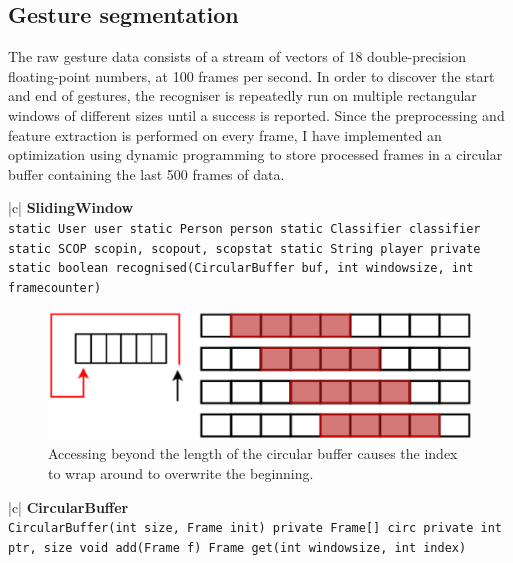 \documentclass[12pt,a4,notitlepage]{report}
\renewcommand{\_}{\texttt{\symbol{95}}}
\newcommand{\<}{\texttt{\symbol{60}}}
\renewcommand{\>}{\texttt{\symbol{62}}}
\newcommand{\class}[1]{\textbf{#1}}
\newcommand{\variable}[1]{\texttt{#1}}
\begin{document}
\subsection{Gesture segmentation}

The raw gesture data consists of a stream of vectors of 18 double-precision floating-point numbers, at 100 frames per second. In order to discover the start and end of gestures, the recogniser is repeatedly run on multiple rectangular windows of different sizes until a success is reported. Since the preprocessing and feature extraction is performed on every frame, I have implemented an optimization using dynamic programming to store processed frames in a circular buffer containing the last 500 frames of data.

\begin{tabular}{|c|} \hline 
\class{SlidingWindow} \\ \hline
{}
{ \variable{static User user \newline
static Person person \newline
static Classifier classifier \newline
static SCOP scopin, scopout, scopstat \newline
static String player \newline
private static boolean recognised(CircularBuffer buf, int windowsize,	int framecounter)
} } \\ \hline
\end{tabular}

\begin{figure}
\centering
\includegraphics[scale=0.5,angle=0]{diagrams/slidingwindow.ps}
\caption{Accessing beyond the length of the circular buffer causes the index to wrap around to overwrite the beginning.}
\label{circbuf}
\end{figure}

\begin{tabular}{|c|} \hline 
\class{CircularBuffer} \\ \hline
{}
{ \variable{CircularBuffer(int size, Frame init) \newline
private Frame[] circ \newline
private int ptr, size \newline
void add(Frame f) \newline
Frame get(int windowsize, int index)
} } \\ \hline
\end{tabular}
\end{document}
